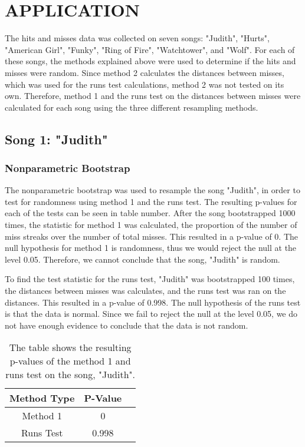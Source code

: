 \documentclass[12pt, letterpaper]{article}
\begin{document}
\section{APPLICATION}
The hits and misses data was collected on seven songs: "Judith", "Hurts", "American Girl", "Funky", "Ring of Fire", "Watchtower", and "Wolf". For each of these songs, the methods explained above were used to determine if the hits and misses were random. Since method 2 calculates the distances between misses, which was used for the runs test calculations, method 2 was not tested on its own. Therefore, method 1 and the runs test on the distances between misses were calculated for each song using the three different resampling methods.
\subsection{Song 1: "Judith"}

\subsubsection{Nonparametric Bootstrap}
The nonparametric bootstrap was used to resample the song "Judith", in order to test for randomness using method 1 and the runs test. The resulting p-values for each of the tests can be seen in table number. After the song bootstrapped 1000 times, the statistic for method 1 was calculated, the proportion of the number of miss streaks over the number of total misses. This resulted in a p-value of 0. The null hypothesis for method 1 is randomness, thus we would reject the null at the level 0.05. Therefore, we cannot conclude that the song, "Judith" is random. 

To find the test statistic for the runs test, "Judith" was bootstrapped 100 times, the distances between misses was calculates, and the runs test was ran on the distances. This resulted in a p-value of 0.998. The null hypothesis of the runs test is that the data is normal. Since we fail to reject the null at the level 0.05, we do not have enough evidence to conclude that the data is not random.
\begin{table}[h]
\begin{center}
\begin{tabular}{|c|c|c|}
\hline
\textbf{Method Type} & P-Value \\
\hline
Method 1 & 0 \\
\hline
Runs Test & 0.998 \\ 
\hline
\end{tabular}
\end{center}
\caption{The table shows the resulting p-values of the method 1 and runs test on the song, "Judith".}
\label{fig: P-values for "Judith"}
\end{table}
\end{document}
